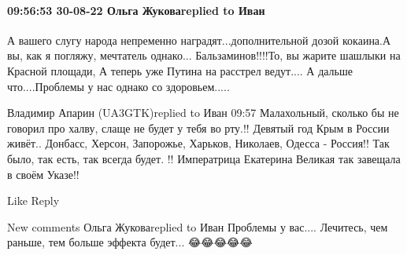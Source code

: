  
 
 
 
 

\paragraph{09:56:53 30-08-22 Ольга Жуковаreplied to Иван}

А вашего слугу народа непременно наградят...дополнительной дозой кокаина.А вы,
как я погляжу, мечтатель однако... Бальзаминов!!!!То, вы жарите шашлыки на
Красной площади, А теперь уже Путина на расстрел ведут.... А дальше
что....Проблемы у нас однако со здоровьем.....

Владимир Апарин (UA3GTK)replied to Иван
09:57
Малахольный, сколько бы не говорил про халву, слаще не будет у тебя во рту.!! Девятый год Крым в России живёт.. Донбасс, Херсон, Запорожье, Харьков, Николаев, Одесса - Россия!! Так было, так есть, так всегда будет. !! Императрица Екатерина Великая так завещала в своём Указе!!

    Like
    Reply

New comments
Ольга Жуковаreplied to Иван
Проблемы у вас.... Лечитесь, чем раньше, тем больше эффекта будет... 😂😂😂😂😂
